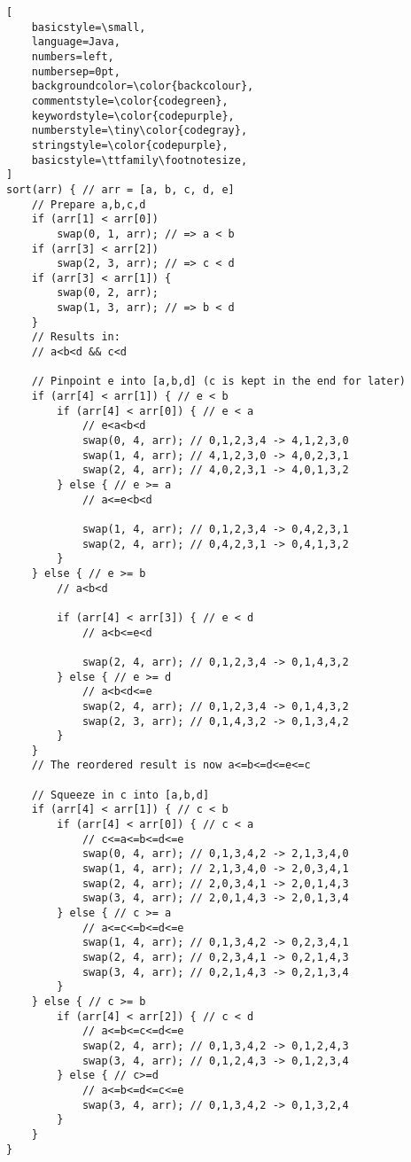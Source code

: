 \documentclass[ngerman,landscape,twocolumn]{adtexsheet}
\begin{document}
\begin{lstlisting}[
    basicstyle=\small,
    language=Java,
    numbers=left,                    
    numbersep=0pt,
    backgroundcolor=\color{backcolour},   
    commentstyle=\color{codegreen},
    keywordstyle=\color{codepurple},
    numberstyle=\tiny\color{codegray},
    stringstyle=\color{codepurple},
    basicstyle=\ttfamily\footnotesize,
]
sort(arr) { // arr = [a, b, c, d, e]
    // Prepare a,b,c,d
    if (arr[1] < arr[0])
        swap(0, 1, arr); // => a < b
    if (arr[3] < arr[2])
        swap(2, 3, arr); // => c < d
    if (arr[3] < arr[1]) {
        swap(0, 2, arr);
        swap(1, 3, arr); // => b < d
    } 
    // Results in:
    // a<b<d && c<d

    // Pinpoint e into [a,b,d] (c is kept in the end for later)
    if (arr[4] < arr[1]) { // e < b
        if (arr[4] < arr[0]) { // e < a
            // e<a<b<d
            swap(0, 4, arr); // 0,1,2,3,4 -> 4,1,2,3,0
            swap(1, 4, arr); // 4,1,2,3,0 -> 4,0,2,3,1
            swap(2, 4, arr); // 4,0,2,3,1 -> 4,0,1,3,2
        } else { // e >= a
            // a<=e<b<d
            
            swap(1, 4, arr); // 0,1,2,3,4 -> 0,4,2,3,1
            swap(2, 4, arr); // 0,4,2,3,1 -> 0,4,1,3,2
        }
    } else { // e >= b
        // a<b<d

        if (arr[4] < arr[3]) { // e < d
            // a<b<=e<d

            swap(2, 4, arr); // 0,1,2,3,4 -> 0,1,4,3,2
        } else { // e >= d
            // a<b<d<=e
            swap(2, 4, arr); // 0,1,2,3,4 -> 0,1,4,3,2
            swap(2, 3, arr); // 0,1,4,3,2 -> 0,1,3,4,2
        }
    }
    // The reordered result is now a<=b<=d<=e<=c

    // Squeeze in c into [a,b,d]
    if (arr[4] < arr[1]) { // c < b
        if (arr[4] < arr[0]) { // c < a
            // c<=a<=b<=d<=e 
            swap(0, 4, arr); // 0,1,3,4,2 -> 2,1,3,4,0
            swap(1, 4, arr); // 2,1,3,4,0 -> 2,0,3,4,1
            swap(2, 4, arr); // 2,0,3,4,1 -> 2,0,1,4,3
            swap(3, 4, arr); // 2,0,1,4,3 -> 2,0,1,3,4
        } else { // c >= a
            // a<=c<=b<=d<=e 
            swap(1, 4, arr); // 0,1,3,4,2 -> 0,2,3,4,1
            swap(2, 4, arr); // 0,2,3,4,1 -> 0,2,1,4,3
            swap(3, 4, arr); // 0,2,1,4,3 -> 0,2,1,3,4
        }
    } else { // c >= b
        if (arr[4] < arr[2]) { // c < d
            // a<=b<=c<=d<=e 
            swap(2, 4, arr); // 0,1,3,4,2 -> 0,1,2,4,3
            swap(3, 4, arr); // 0,1,2,4,3 -> 0,1,2,3,4
        } else { // c>=d
            // a<=b<=d<=c<=e 
            swap(3, 4, arr); // 0,1,3,4,2 -> 0,1,3,2,4
        }
    }
}

\end{lstlisting}
\end{document}
